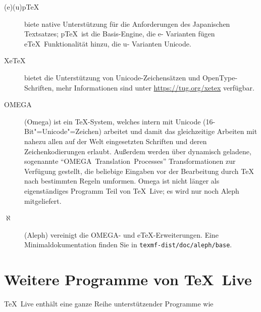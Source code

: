 \documentclass[12pt,ngerman,a4paper,fullparskip]{scrreprt}
\newcommand{\TL}{\TeX\ Live\xspace}
\newcommand{\OnCD}[1]{\texttt{#1}}
\providecommand*{\eTeX}{e\TeX\xspace}
\begin{document}
\begin{description}
\item [(e)(u)p\TeX] biete native Unterstützung für die Anforderungen des Japanischen Textsatzes; p\TeX\ ist die Basis-Engine, die e- Varianten fügen \eTeX\ Funktionalität hinzu, die u- Varianten Unicode.


\item [XeTeX] bietet die Unterstützung von Unicode-Zeichensätzen und Open\-Type-Schriften, mehr Informationen sind unter \url{https://tug.org/xetex} verfügbar.

\item [OMEGA] (Omega) ist ein \TeX-System, welches intern mit Unicode (16-Bit"=Unicode"=Zeichen) arbeitet und damit das gleichzeitige Arbeiten mit nahezu allen auf der Welt eingesetzten Schriften
      und deren Zeichenkodierungen erlaubt. Außerdem werden über dynamisch
      geladene, sogenannte \enquote{OMEGA~Translation~Processes} Transformationen zur Verfügung gestellt, die beliebige Eingaben vor der Bearbeitung durch {\TeX} nach bestimmten Regeln
      umformen. Omega ist nicht länger als eigenständiges Programm Teil von \TL; es wird nur noch Aleph mitgeliefert.

\item [$\aleph$] (Aleph) vereinigt die OMEGA- und \eTeX-Erweiterungen.  Eine Minimaldokumentation finden Sie in \OnCD{texmf-dist/doc/aleph/base}.
\end{description}

\section{Weitere Programme von \TL}

\TL enthält eine ganze Reihe unterstützender Programme wie
\end{document}
